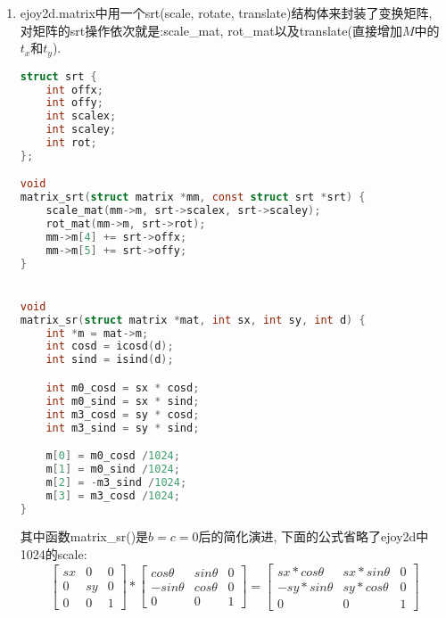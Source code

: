 {\begin {enumerate}
{        代码中对角度的计算做了一个$cos$表, $cos$和$sin$的计算都是通过查表来得到的, 代码中做$sin$计算时的64, 是$sin\theta = cos(90 - \theta)$经过1024换算后得到的.
\begin{lstlisting}[language={[ANSI]C}]
static inline int
icost(int dd) {
    static int t[256] = {
    ...
    };
    if (dd < 0) {
        dd = 256 - (-dd % 256);
    } else {
        dd %= 256;
    }

    return t[dd];
}

static inline int
icosd(int d) {
    int dd = d/4;
    return icost(dd);
}

static inline int
isind(int d) {
    int dd = 64 - d/4;
    return icost(dd);
}
\end{lstlisting}
    }

    \gaccobsplitinv

    \item{ {}\par
        ejoy2d.matrix中用一个srt(scale, rotate, translate)结构体来封装了变换矩阵, 对矩阵的srt操作依次就是:scale\_mat, rot\_mat以及translate(直接增加$M$中的$t_x$和$t_y$).
\begin{lstlisting}[language=C]
struct srt {
	int offx;
	int offy;
	int scalex;
	int scaley;
	int rot;
};

void
matrix_srt(struct matrix *mm, const struct srt *srt) {
	scale_mat(mm->m, srt->scalex, srt->scaley);
	rot_mat(mm->m, srt->rot);
	mm->m[4] += srt->offx;
	mm->m[5] += srt->offy;
}


void
matrix_sr(struct matrix *mat, int sx, int sy, int d) {
	int *m = mat->m;
	int cosd = icosd(d);
	int sind = isind(d);

	int m0_cosd = sx * cosd;
	int m0_sind = sx * sind;
	int m3_cosd = sy * cosd;
	int m3_sind = sy * sind;

	m[0] = m0_cosd /1024;
	m[1] = m0_sind /1024;
	m[2] = -m3_sind /1024;
	m[3] = m3_cosd /1024;
}
\end{lstlisting}
        其中函数matrix\_sr()是$b = c = 0$后的简化演进, 下面的公式省略了ejoy2d中1024的scale:
        \begin{equation}
        \begin{bmatrix}
            sx  &   0   &   0\\
            0   &   sy  &   0\\
            0   &   0   &   1
        \end{bmatrix}
        *
        \begin{bmatrix}
            cos\theta   &   sin\theta   &   0\\
            -sin\theta  &   cos\theta   &   0\\
            0           &   0           &   1
        \end{bmatrix}
        =
        \begin{bmatrix}
            sx*cos\theta    &   sx*sin\theta    &   0\\
            -sy*sin\theta   &   sy*cos\theta    &   0\\
            0               &   0               &   1
        \end{bmatrix}
        \end{equation}
    }


\end{enumerate}}
